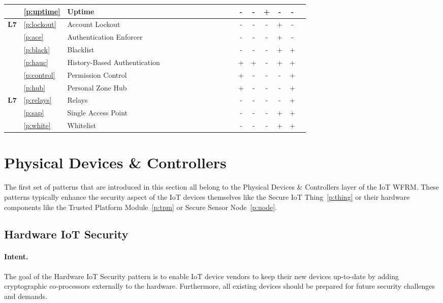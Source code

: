 \begin{landscape}
\begin{longtable}[c]{lllcccccccccccccccc}
	& \ref{p:uptime} & Uptime & & & & & & & & \checkmark & & & - & - & + & - & - \\
	\hline
	\multirow{6}{*}{\textbf{L7}} & \ref{p:lockout} & Account Lockout & \checkmark & & & & & & & & & & - & - & - & + & - \\
	& \ref{p:ace} & Authentication Enforcer & & & \checkmark & & & & & & & & - & - & - & + & - \\
	& \ref{p:black} & Blacklist & & & \checkmark & & & & & \checkmark & & & - & - & - & + & + \\
	& \ref{p:hauc} & History-Based Authentication & \checkmark & & & & & & & & & & + & + & - & + & + \\
	& \ref{p:control} & Permission Control & & & & & & \checkmark & & \checkmark & \checkmark & & + & - & - & - & + \\
	& \ref{p:hub} & Personal Zone Hub & & & & & & \checkmark & & & & & + & - & - & - & + \\
	\hline
	\multirow{3}{*}{\textbf{L7}} & \ref{p:relays} & Relays & & & & & & & & & & & - & - & - & - & + \\
	& \ref{p:sap} & Single Access Point & & & \checkmark & & & & & & & & - & - & - & + & + \\
	& \ref{p:white} & Whitelist & & & \checkmark & & & & & \checkmark & & & - & - & - & + & + \\
	\hline
\end{longtable}
\end{landscape}



\section{Physical Devices \& Controllers}\label{L1}
The first set of patterns that are introduced in this section all belong to the Physical Devices \& Controllers layer of the IoT WFRM. These patterns typically enhance the security aspect of the IoT devices themselves like the Secure IoT Thing~\ref{p:thing} or their hardware components like the Trusted Platform Module~\ref{p:tpm} or Secure Sensor Node~\ref{p:node}. 


\subsection{Hardware IoT Security~\cite{Schuss2018}}
\label{p:hardware} 

\paragraph{\textbf{Intent.}} The goal of the Hardware IoT Security pattern is to enable IoT device vendors to keep their new devices up-to-date by adding cryptographic co-processors externally to the hardware. Furthermore, all existing devices should be prepared for future security challenges and demands. 

